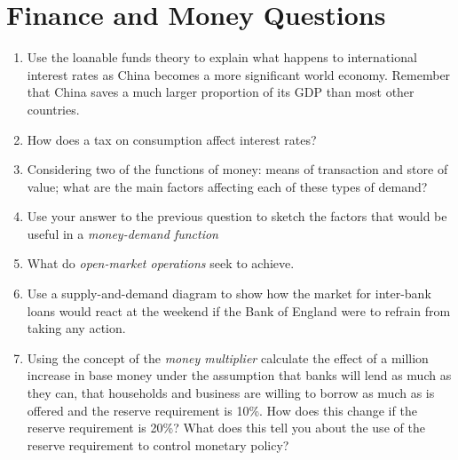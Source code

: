 \documentclass[14pt]{article}
\begin{document}
\section*{Finance and Money Questions}
\begin{enumerate}
\item Use the loanable funds theory to explain what happens to international interest rates as China becomes a more significant world economy.  Remember that China saves a much larger proportion of its GDP than most other countries. 
\item How does a tax on consumption affect interest rates?
\item Considering two of the functions of money: means of transaction and store of value; what are the main factors affecting each of these types of demand? 
\item Use your answer to the previous question to sketch the factors that would be useful in a \emph{money-demand function}
\item What do \emph{open-market operations} seek to achieve. 
\item Use a supply-and-demand diagram to show how the market for inter-bank loans would react at the weekend if the Bank of England were to refrain from taking any action. 
\item Using the concept of the \emph{money multiplier} calculate the effect of a  million increase in base money under the assumption that banks will lend as much as they can, that households and business are willing to borrow as much as is offered and the reserve requirement is 10\%.  How does this change if the reserve requirement is 20\%?  What does this tell you about the use of the reserve requirement to control monetary policy? 
\end{enumerate}
\end{document}
